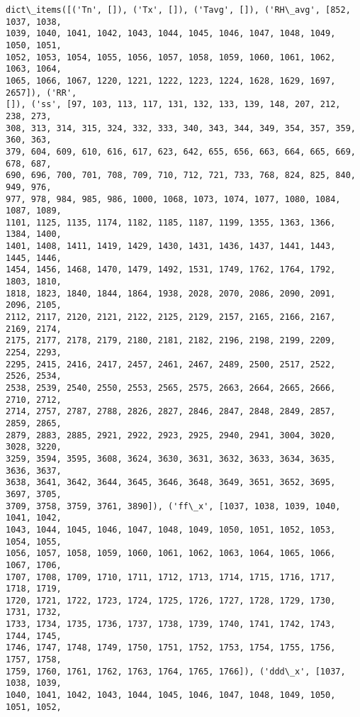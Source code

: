 \documentclass[11pt]{article}
\makeatletter
\newcommand{\boxspacing}{\kern\kvtcb@left@rule\kern\kvtcb@boxsep}
\newcommand{\prompt}[4]{
        {\ttfamily\llap{{\color{#2}[#3]:\hspace{3pt}#4}}\vspace{-\baselineskip}}
    }
\makeatother
\begin{document}
            \begin{tcolorbox}[breakable, size=fbox, boxrule=.5pt, pad at break*=1mm, opacityfill=0]
\prompt{Out}{outcolor}{ }{\boxspacing}
\begin{Verbatim}[commandchars=\\\{\}]
dict\_items([('Tn', []), ('Tx', []), ('Tavg', []), ('RH\_avg', [852, 1037, 1038,
1039, 1040, 1041, 1042, 1043, 1044, 1045, 1046, 1047, 1048, 1049, 1050, 1051,
1052, 1053, 1054, 1055, 1056, 1057, 1058, 1059, 1060, 1061, 1062, 1063, 1064,
1065, 1066, 1067, 1220, 1221, 1222, 1223, 1224, 1628, 1629, 1697, 2657]), ('RR',
[]), ('ss', [97, 103, 113, 117, 131, 132, 133, 139, 148, 207, 212, 238, 273,
308, 313, 314, 315, 324, 332, 333, 340, 343, 344, 349, 354, 357, 359, 360, 363,
379, 604, 609, 610, 616, 617, 623, 642, 655, 656, 663, 664, 665, 669, 678, 687,
690, 696, 700, 701, 708, 709, 710, 712, 721, 733, 768, 824, 825, 840, 949, 976,
977, 978, 984, 985, 986, 1000, 1068, 1073, 1074, 1077, 1080, 1084, 1087, 1089,
1101, 1125, 1135, 1174, 1182, 1185, 1187, 1199, 1355, 1363, 1366, 1384, 1400,
1401, 1408, 1411, 1419, 1429, 1430, 1431, 1436, 1437, 1441, 1443, 1445, 1446,
1454, 1456, 1468, 1470, 1479, 1492, 1531, 1749, 1762, 1764, 1792, 1803, 1810,
1818, 1823, 1840, 1844, 1864, 1938, 2028, 2070, 2086, 2090, 2091, 2096, 2105,
2112, 2117, 2120, 2121, 2122, 2125, 2129, 2157, 2165, 2166, 2167, 2169, 2174,
2175, 2177, 2178, 2179, 2180, 2181, 2182, 2196, 2198, 2199, 2209, 2254, 2293,
2295, 2415, 2416, 2417, 2457, 2461, 2467, 2489, 2500, 2517, 2522, 2526, 2534,
2538, 2539, 2540, 2550, 2553, 2565, 2575, 2663, 2664, 2665, 2666, 2710, 2712,
2714, 2757, 2787, 2788, 2826, 2827, 2846, 2847, 2848, 2849, 2857, 2859, 2865,
2879, 2883, 2885, 2921, 2922, 2923, 2925, 2940, 2941, 3004, 3020, 3028, 3220,
3259, 3594, 3595, 3608, 3624, 3630, 3631, 3632, 3633, 3634, 3635, 3636, 3637,
3638, 3641, 3642, 3644, 3645, 3646, 3648, 3649, 3651, 3652, 3695, 3697, 3705,
3709, 3758, 3759, 3761, 3890]), ('ff\_x', [1037, 1038, 1039, 1040, 1041, 1042,
1043, 1044, 1045, 1046, 1047, 1048, 1049, 1050, 1051, 1052, 1053, 1054, 1055,
1056, 1057, 1058, 1059, 1060, 1061, 1062, 1063, 1064, 1065, 1066, 1067, 1706,
1707, 1708, 1709, 1710, 1711, 1712, 1713, 1714, 1715, 1716, 1717, 1718, 1719,
1720, 1721, 1722, 1723, 1724, 1725, 1726, 1727, 1728, 1729, 1730, 1731, 1732,
1733, 1734, 1735, 1736, 1737, 1738, 1739, 1740, 1741, 1742, 1743, 1744, 1745,
1746, 1747, 1748, 1749, 1750, 1751, 1752, 1753, 1754, 1755, 1756, 1757, 1758,
1759, 1760, 1761, 1762, 1763, 1764, 1765, 1766]), ('ddd\_x', [1037, 1038, 1039,
1040, 1041, 1042, 1043, 1044, 1045, 1046, 1047, 1048, 1049, 1050, 1051, 1052,

\end{Verbatim}
\end{tcolorbox}
\end{document}
